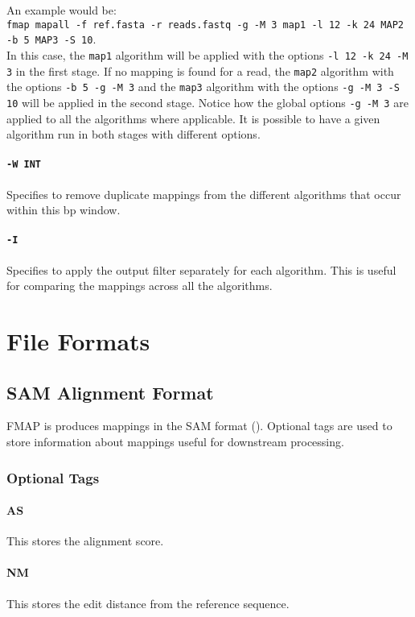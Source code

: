 \documentclass[a4paper,12pt]{book}
\newcommand{\TT}[1]{{\tt #1}} %
\begin{document}
An example would be:\\
\TT{fmap mapall -f ref.fasta -r reads.fastq -g -M 3 map1 -l 12 -k 24 MAP2 -b 5 MAP3 -S 10}.\\
In this case, the \TT{map1} algorithm will be applied with the options \TT{-l 12 -k 24 -M 3} in the first stage.
If no mapping is found for a read, the \TT{map2} algorithm with the options \TT{-b 5 -g -M 3} and the \TT{map3} algorithm with the options \TT{-g -M 3 -S 10} will be applied in the second stage.
Notice how the global options \TT{-g -M 3} are applied to all the algorithms where applicable.
It is possible to have a given algorithm run in both stages with different options.

\subsubsection{\TT{-W INT}}
Specifies to remove duplicate mappings from the different algorithms that occur within this bp window.

\subsubsection{\TT{-I}}
Specifies to apply the output filter separately for each algorithm.
This is useful for comparing the mappings across all the algorithms.

\chapter{File Formats}

\section{SAM Alignment Format}
FMAP is produces mappings in the SAM format (\cite{SAM-format}).
Optional tags are used to store information about mappings useful for downstream processing.


\subsection{Optional Tags}

\subsubsection{AS}
This stores the alignment score.

\subsubsection{NM}
This stores the edit distance from the reference sequence.
\end{document}
